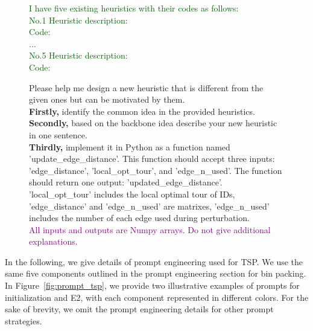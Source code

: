 \begin{figure}[htbp]
\begin{minipage}{0.61\textwidth}
\begin{dialogbox}
  \textcolor{darkgreen}{I have five existing heuristics with their codes as follows: \\
  No.1 Heuristic description: \\
       Code:   \\
       ... \\
  No.5 Heuristic description: \\
       Code: \\  } 
       
   Please help me design a new heuristic that is different from the given ones but can be motivated by them. \\
   \textbf{Firstly,} identify the common idea in the provided heuristics.   \\
   \textbf{Secondly,} based on the backbone idea \textcolor{navyblue}{describe your new heuristic in one sentence.} \\
   \textbf{Thirdly,} implement it in Python as a function named \textcolor{navyblue}{'update\_edge\_distance'}. This function should accept \textcolor{navyblue}{three inputs: 'edge\_distance', 'local\_opt\_tour', and 'edge\_n\_used'}. The function should return \textcolor{navyblue}{one output: 'updated\_edge\_distance'}. \textcolor{navyblue}{'local\_opt\_tour' includes the local optimal tour of IDs, 'edge\_distance' and 'edge\_n\_used' are matrixes, 'edge\_n\_used' includes the number of each edge used during perturbation.}  \\

  \textcolor{purple}{All inputs and outputs are Numpy arrays. Do not give additional explanations.}
\end{dialogbox}
\end{minipage}
\end{figure}

In the following, we give details of prompt engineering used for TSP. We use the same five components outlined in the prompt engineering section for bin packing. In Figure~\ref{fig:prompt_tsp}, we provide two illustrative examples of prompts for initialization and E2, with each component represented in different colors. For the sake of brevity, we omit the prompt engineering details for other prompt strategies.

